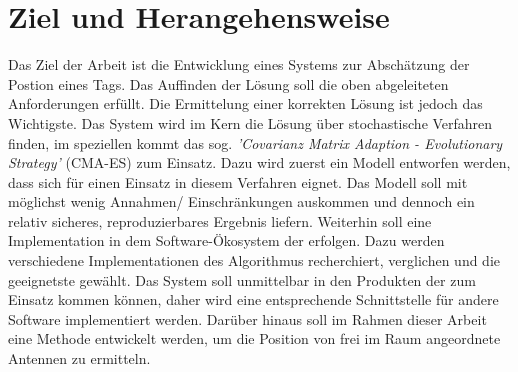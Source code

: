 \section{Ziel und Herangehensweise}
%
Das Ziel der Arbeit ist die Entwicklung eines Systems zur Abschätzung der Postion eines Tags. Das Auffinden der Lösung soll die oben abgeleiteten Anforderungen erfüllt. Die Ermittelung einer korrekten Lösung ist jedoch das Wichtigste. Das System wird im Kern die Lösung über stochastische Verfahren finden, im speziellen kommt das sog. \textit{'Covarianz Matrix Adaption - Evolutionary Strategy'} (CMA-ES) zum Einsatz. Dazu wird zuerst ein Modell entworfen werden, dass sich für einen Einsatz in diesem Verfahren eignet. Das Modell soll mit möglichst wenig Annahmen/ Einschränkungen auskommen und dennoch ein relativ sicheres, reproduzierbares Ergebnis liefern. Weiterhin soll eine Implementation in dem Software-Ökosystem der \amedogmbh erfolgen. Dazu werden verschiedene Implementationen des Algorithmus recherchiert, verglichen und die geeignetste gewählt. Das System soll unmittelbar in den Produkten der \amedogmbh zum Einsatz kommen können, daher wird eine entsprechende Schnittstelle für andere Software implementiert werden. Darüber hinaus soll im Rahmen dieser Arbeit eine Methode entwickelt werden, um die Position von frei im Raum angeordnete Antennen zu ermitteln.
%
